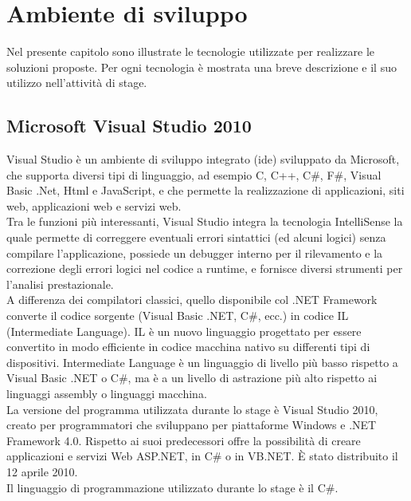 
\chapter{Ambiente di sviluppo}
\label{cap:ambiente-sviluppo}

Nel presente capitolo sono illustrate le tecnologie utilizzate per realizzare le soluzioni proposte. Per ogni tecnologia è mostrata una breve descrizione e il suo utilizzo nell'attività di stage.
\section{Microsoft Visual Studio 2010}
Visual Studio è un ambiente di sviluppo integrato (\gls{ide}) sviluppato da Microsoft, che supporta diversi tipi di linguaggio, ad esempio C, C++, C\#, F\#, Visual Basic .Net, Html e JavaScript, e che permette la realizzazione di applicazioni, siti web, applicazioni web e servizi web.
\\
Tra le funzioni più interessanti, Visual Studio integra la tecnologia IntelliSense la quale permette di correggere eventuali errori sintattici (ed alcuni logici) senza compilare l'applicazione, possiede un debugger interno per il rilevamento e la correzione degli errori logici nel codice a runtime, e fornisce diversi strumenti per l'analisi prestazionale.
\\
A differenza dei compilatori classici, quello disponibile col .NET Framework converte il codice sorgente (Visual Basic .NET, C\#, ecc.) in codice IL (Intermediate Language).
IL è un nuovo linguaggio progettato per essere convertito in modo efficiente in codice macchina nativo su differenti tipi di dispositivi. Intermediate Language è un linguaggio di livello più basso rispetto a Visual Basic .NET o C\#, ma è a un livello di astrazione più alto rispetto ai linguaggi assembly o linguaggi macchina.
\\
La versione del programma utilizzata durante lo stage è Visual Studio 2010, creato per programmatori che sviluppano per piattaforme Windows e .NET Framework 4.0. Rispetto ai suoi predecessori offre la possibilità di creare applicazioni e servizi Web ASP.NET, in C\# o in VB.NET. È stato distribuito il 12 aprile 2010. 
\\
Il linguaggio di programmazione utilizzato durante lo stage è il C\#.

